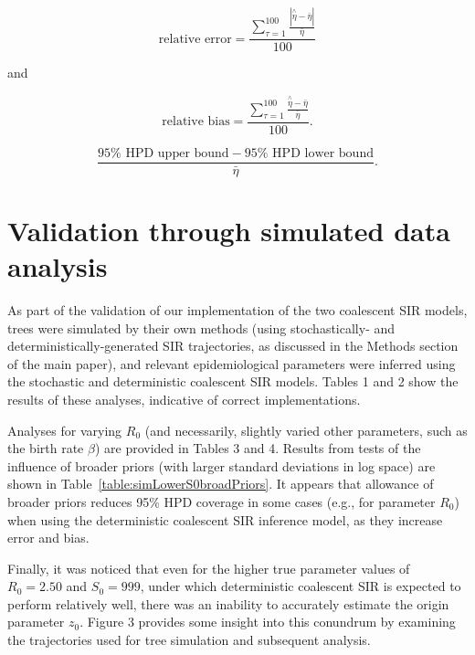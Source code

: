 \documentclass[10pt]{article}
\newcommand{\deterCoalSIR}{deterministic coalescent SIR}
\begin{document}
$$\text{relative error} = \frac{\sum\nolimits_{\tau = 1}^{100}\frac{|\overset{\wedge}{\eta} - 
\bar{\eta}|}{\bar{\eta}}}{100} $$

\begin{center}
and
\end{center}
$$\text{relative bias} = \frac{\sum\nolimits_{\tau = 1}^{100}\frac{\overset{\wedge}{\eta} - 
\bar{\eta}}{\bar{\eta}}}{100} . $$

\vspace{3 mm}
\vspace{1 mm}
$$\frac{95\% \text{ HPD upper bound} - 95\% \text{ HPD lower bound}}{\bar{\eta}} . $$

\vspace{3 mm}

\section{Validation through simulated data analysis}
As part of the validation of our implementation of the two coalescent SIR models, trees were 
simulated by their own methods (using stochastically- and deterministically-generated SIR trajectories, 
as discussed in the Methods section of the main paper), and relevant epidemiological parameters were inferred using the 
stochastic and deterministic coalescent SIR models.  Tables 1 and 2 show the results of these analyses, 
indicative of correct implementations. 

Analyses for varying $R_0$ (and necessarily, slightly varied other parameters, such as the birth rate $\beta$) are provided 
in Tables 3 and 4.  Results from tests of the influence of broader priors (with larger standard deviations in log space) are shown in Table~\ref{table:simLowerS0broadPriors}.  
It appears that allowance of broader priors reduces 95\% HPD coverage in some cases (e.g., for parameter $R_0$) when using the \deterCoalSIR{} inference model, as they increase error and bias.

Finally, it was noticed that even for the higher true parameter values of $R_{0}=2.50$ and $S_{0}=999$, under which \deterCoalSIR{} is expected to 
perform relatively well, there was an inability to accurately estimate the origin parameter $z_0$.  Figure 3 provides some insight into 
this conundrum by examining the trajectories used for tree simulation and subsequent analysis. 
\end{document}
